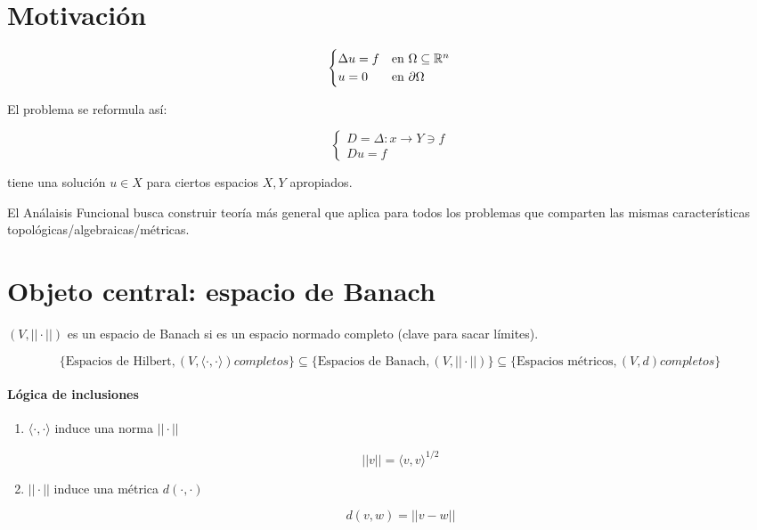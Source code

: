 \documentclass[../Apunte.tex]{subfiles}
\begin{document}
\section{Motivación}

\begin{fexample}
    \[\begin{cases}
        \Delta u=f&\text{en }\Omega\subseteq \mathbb{R}^n\\
        u=0&\text{en } \partial \Omega
    \end{cases}\]


    El problema se reformula así:

    \[\begin{cases}
        D=\Delta:x\to Y\ni f\\
        Du=f
    \end{cases}\]
    
    tiene una solución $u\in X$ para ciertos espacios $X,Y$ apropiados.
\end{fexample}

El Análaisis Funcional busca construir teoría más general que aplica para todos los problemas que \color{red} comparten \color{black}las \color{red}mismas características \color{black}topológicas/algebraicas/métricas.

\section{Objeto central: espacio de Banach}

\begin{fdefinition}
    $(V,||\cdot ||)$ es un espacio de Banach si es un espacio normado \color{red}completo \color{black}(clave para sacar límites).
\end{fdefinition}

\[\{\text{Espacios de Hilbert}, (V,\langle \cdot,\cdot\rangle) completos\}\subseteq\{\text{Espacios de Banach}, (V,||\cdot||)\}\subseteq \{\text{Espacios métricos}, (V,d) completos\}\]


\paragraph{Lógica de inclusiones}

\begin{enumerate}
    \item $\langle\cdot,\cdot\rangle$ induce una norma $||\cdot||$

    \[||v||=\langle v,v\rangle^{1/2}\]

    \item $||\cdot||$ induce una métrica $d(\cdot,\cdot)$

    \[d(v,w)=||v-w||\]
\end{enumerate}
\end{document}
